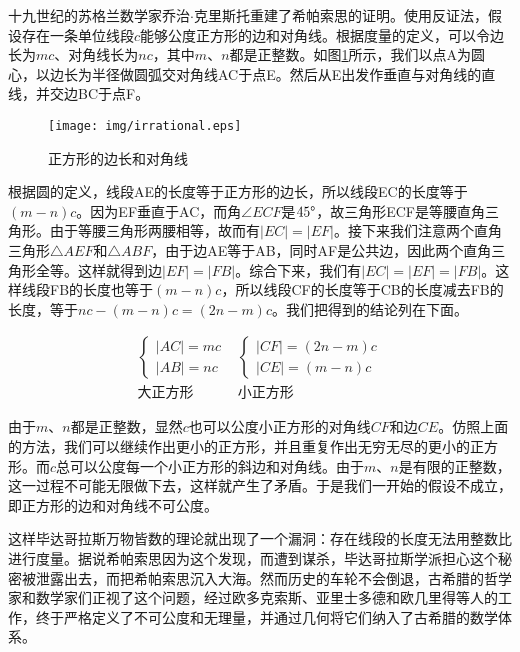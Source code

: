 \documentclass{article}
\begin{document}
十九世纪的苏格兰数学家乔治$\cdot$克里斯托重建了希帕索思的证明。使用反证法，假设存在一条单位线段$c$能够公度正方形的边和对角线。根据度量的定义，可以令边长为$mc$、对角线长为$nc$，其中$m$、$n$都是正整数。如图\ref{fig:irrational}所示，我们以点A为圆心，以边长为半径做圆弧交对角线AC于点E。然后从E出发作垂直与对角线的直线，并交边BC于点F。

\begin{figure}[htbp]
 \centering
 \texttt{[image: img/irrational.eps]}
 \caption{正方形的边长和对角线}
 \label{fig:irrational}
\end{figure}

根据圆的定义，线段AE的长度等于正方形的边长，所以线段EC的长度等于$(m - n)c$。因为EF垂直于AC，而角$\angle ECF$是$45\degree$，故三角形ECF是等腰直角三角形。由于等腰三角形两腰相等，故而有$|EC| = |EF|$。接下来我们注意两个直角三角形$\triangle AEF$和$\triangle ABF$，由于边AE等于AB，同时AF是公共边，因此两个直角三角形全等。这样就得到边$|EF| = |FB|$。综合下来，我们有$|EC| = |EF| = |FB|$。这样线段FB的长度也等于$(m - n)c$，所以线段CF的长度等于CB的长度减去FB的长度，等于$nc - (m - n)c = (2n - m)c$。我们把得到的结论列在下面。

\[
\begin{array}{c|c}
\begin{cases}
|AC| = mc \\
|AB| = nc
\end{cases} &
\begin{cases}
|CF| = (2n - m)c \\
|CE| = (m - n)c
\end{cases} \\[4ex]
\text{大正方形} & \text{小正方形}
\end{array}
\]

由于$m$、$n$都是正整数，显然$c$也可以公度小正方形的对角线$CF$和边$CE$。仿照上面的方法，我们可以继续作出更小的正方形，并且重复作出无穷无尽的更小的正方形。而$c$总可以公度每一个小正方形的斜边和对角线。由于$m$、$n$是有限的正整数，这一过程不可能无限做下去，这样就产生了矛盾。于是我们一开始的假设不成立，即正方形的边和对角线不可公度。

这样毕达哥拉斯万物皆数的理论就出现了一个漏洞：存在线段的长度无法用整数比进行度量。据说希帕索思因为这个发现，而遭到谋杀，毕达哥拉斯学派担心这个秘密被泄露出去，而把希帕索思沉入大海。然而历史的车轮不会倒退，古希腊的哲学家和数学家们正视了这个问题，经过欧多克索斯、亚里士多德和欧几里得等人的工作，终于严格定义了不可公度和无理量，并通过几何将它们纳入了古希腊的数学体系。
\end{document}

